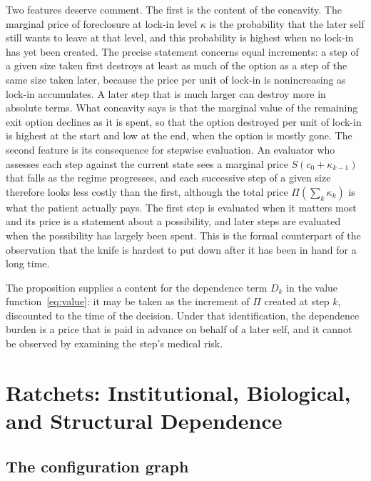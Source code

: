 \documentclass[11pt]{article}
\theoremstyle{plain}
\theoremstyle{definition}
\theoremstyle{remark}
\begin{document}
Two features deserve comment. The first is the content of the concavity. The marginal price of foreclosure at lock-in level $\kappa$ is the probability that the later self still wants to leave at that level, and this probability is highest when no lock-in has yet been created. The precise statement concerns equal increments: a step of a given size taken first destroys at least as much of the option as a step of the same size taken later, because the price per unit of lock-in is nonincreasing as lock-in accumulates. A later step that is much larger can destroy more in absolute terms. What concavity says is that the marginal value of the remaining exit option declines as it is spent, so that the option destroyed per unit of lock-in is highest at the start and low at the end, when the option is mostly gone. The second feature is its consequence for stepwise evaluation. An evaluator who assesses each step against the current state sees a marginal price $S(c_0+\kappa_{k-1})$ that falls as the regime progresses, and each successive step of a given size therefore looks less costly than the first, although the total price $\Pi(\sum_k\kappa_k)$ is what the patient actually pays. The first step is evaluated when it matters most and its price is a statement about a possibility, and later steps are evaluated when the possibility has largely been spent. This is the formal counterpart of the observation that the knife is hardest to put down after it has been in hand for a long time.

The proposition supplies a content for the dependence term $D_k$ in the value function~\eqref{eq:value}: it may be taken as the increment of $\Pi$ created at step $k$, discounted to the time of the decision. Under that identification, the dependence burden is a price that is paid in advance on behalf of a later self, and it cannot be observed by examining the step's medical risk.

\section{Ratchets: Institutional, Biological, and Structural Dependence}\label{sec:ratchet}

\subsection{The configuration graph}
\end{document}
